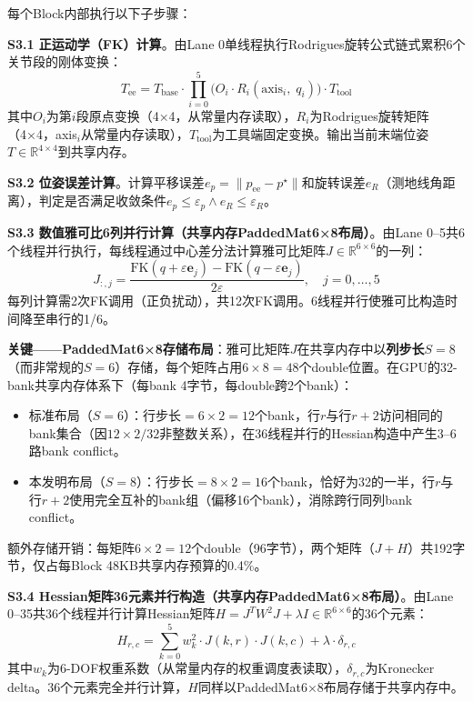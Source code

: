 \documentclass[a4paper,12pt]{ctexart}
\newcommand{\R}{\mathbb{R}}
\begin{document}
每个Block内部执行以下子步骤：

\textbf{S3.1 正运动学（FK）计算}。由Lane 0单线程执行Rodrigues旋转公式链式累积6个关节段的刚体变换：
\begin{equation}
T_{\mathrm{ee}}=T_{\text{base}}\cdot\prod_{i=0}^{5}\bigl(O_i\cdot R_i(\mathrm{axis}_i,\;q_i)\bigr)\cdot T_{\text{tool}}
\end{equation}
其中$O_i$为第$i$段原点变换（4×4，从常量内存读取），$R_i$为Rodrigues旋转矩阵（4×4，axis$_i$从常量内存读取），$T_{\text{tool}}$为工具端固定变换。输出当前末端位姿$T\in\R^{4\times4}$到共享内存。

\textbf{S3.2 位姿误差计算}。计算平移误差$e_p=\|p_{\mathrm{ee}}-p^\star\|$和旋转误差$e_R$（测地线角距离），判定是否满足收敛条件$e_p\leq\varepsilon_p\land e_R\leq\varepsilon_R$。

\textbf{S3.3 数值雅可比6列并行计算（共享内存PaddedMat6×8布局）}。由Lane 0--5共6个线程并行执行，每线程通过中心差分法计算雅可比矩阵$J\in\R^{6\times6}$的一列：
\begin{equation}
J_{:,j}=\frac{\mathrm{FK}(q+\varepsilon\mathbf{e}_j)-\mathrm{FK}(q-\varepsilon\mathbf{e}_j)}{2\varepsilon},\quad j=0,\dots,5
\end{equation}
每列计算需2次FK调用（正负扰动），共12次FK调用。6线程并行使雅可比构造时间降至串行的1/6。

\textbf{关键——PaddedMat6×8存储布局}：雅可比矩阵$J$在共享内存中以\textbf{列步长$S=8$}（而非常规的$S=6$）存储，每个矩阵占用$6\times8=48$个double位置。在GPU的32-bank共享内存体系下（每bank 4字节，每double跨2个bank）：
\begin{itemize}
    \item 标准布局（$S=6$）：行步长$=6\times2=12$个bank，行$r$与行$r+2$访问相同的bank集合（因$12\times2/32$非整数关系），在36线程并行的Hessian构造中产生3--6路bank conflict。
    \item 本发明布局（$S=8$）：行步长$=8\times2=16$个bank，恰好为32的一半，行$r$与行$r+2$使用完全互补的bank组（偏移16个bank），消除跨行同列bank conflict。
\end{itemize}
额外存储开销：每矩阵$6\times2=12$个double（96字节），两个矩阵（$J+H$）共192字节，仅占每Block 48KB共享内存预算的0.4\%。

\textbf{S3.4 Hessian矩阵36元素并行构造（共享内存PaddedMat6×8布局）}。由Lane 0--35共36个线程并行计算Hessian矩阵$H=J^T W^2 J+\lambda I\in\R^{6\times6}$的36个元素：
\begin{equation}
H_{r,c}=\sum_{k=0}^{5}w_k^2\cdot J(k,r)\cdot J(k,c)+\lambda\cdot\delta_{r,c}
\end{equation}
其中$w_k$为6-DOF权重系数（从常量内存的权重调度表读取），$\delta_{r,c}$为Kronecker delta。36个元素完全并行计算，$H$同样以PaddedMat6×8布局存储于共享内存中。
\end{document}
